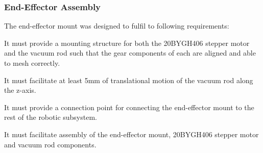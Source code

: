 %
%

\subsubsection{End-Effector Assembly}

The end-effector mount was designed to fulfil to following requirements:

\begin{compactitem}
	\item It must provide a mounting structure for both the 20BYGH406 stepper motor and the vacuum rod such that the gear components of each are aligned and able to mesh correctly.
	\item It must facilitate at least 5mm of translational motion of the vacuum rod along the z-axis.
	\item It must provide a connection point for connecting the end-effector mount to the rest of the robotic subsystem.
	\item It must facilitate assembly of the end-effector mount, 20BYGH406 stepper motor and vacuum rod components. 
\end{compactitem}

